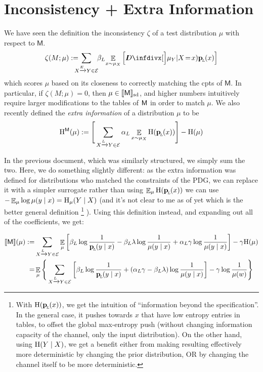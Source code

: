 \documentclass{article}
\newcommand{\sfM}{\mathsf M}
\newcommand\SD{_{\text{sd}}}
\begin{document}
	
	\section{Inconsistency + Extra Information}
			
	We have seen the definition the inconsistency $\zeta$ of a test distribution $\mu$ with respect to $\sfM$.
	\[
		\zeta(M ; \mu) := %
		\!\!\!\!\!\sum_{ X \xrightarrow{\!\!E} Y  \in \Ed }\!\! \beta_L \! \mathop{\mathbb E}_{x \sim \mu_X} \left[\kldiv[\Big]{ \mu_Y | X \!=\! x) }{\bp(x) } \right]
	\] 
	which scores $\mu$ based on its closeness to correctly matching the cpts of $\sfM$. In particular, if $\zeta(M;\mu) = 0$, then $\mu \in \bbr{\sfM}\SD$, and higher numbers intuitively require larger modifications to the tables of $\sf M$ in order to match $\mu$.     
	We also recently defined the \emph{extra information} of a distribution $\mu$ to be
	\[ \H^{\sfM}(\mu) := \Bigg[\sum_{ X \xrightarrow{\!\!L} Y  \in \Ed } \alpha_L \E_{x \sim \mu_X}  \H (\bp (x)) \Bigg] - \H(\mu) \] 
	
	In the previous document, which was similarly structured, we simply sum the two. Here, we do something slightly different: as the extra information was defined for distributions who matched the constraints of the PDG, we can replace it with a simpler surrogate rather than using $\mathop{\mathbb E}_\mu\mathrm{H}(\mathbf p_{\!_{L}\!}(x))$ we can use $- \mathop{\mathbb E}_\mu \log \mu(y \mid x) = \mathrm{H}_\mu(Y \mid X)$ (and it's not clear to me as of yet which is the better general definition%
		\footnote{With $\mathrm{H}(\mathbf p_{\!_{L}\!}(x))$, we get the intuition of ``information beyond the specification''. In the general case, it pushes towards $x$ that have low entropy entries in tables, to offset the global max-entropy push (without changing information capacity of the channel, only the input distribution). On the other hand, using $\mathrm{H}(Y \mid X)$, we get a benefit either from making resulting effectively more deterministic by changing the prior distribution, OR by changing the channel itself to be more deterministic. }%
	). Using this definition instead, and expanding out all of the coefficients, we get:
	
	\begin{align*}
		\bbr{\sfM}(\mu) :=&\sum_{ X \xrightarrow{\!\!L} Y  \in \Ed } \E_\mu  \left[
			\beta_L \log \frac{1}{\bp(y\mid x)} - \beta_L \lambda \log \frac{1}{\mu(y \mid x)} + \alpha_L \gamma \log \frac{1}{\mu(y\mid x)}  \right] - \gamma \H(\mu) \\
			=&\E_\mu \Bigg\{   \sum_{ X \xrightarrow{\!\!L} Y  \in \Ed } \left[
			\beta_L \log \frac{1}{\bp(y\mid x)} + (\alpha_L \gamma - \beta_L \lambda) \log \frac{1}{\mu(y \mid x)} \right] - \gamma \log \frac{1}{\mu(w)} \Bigg\} 
	\end{align*}
\end{document}
